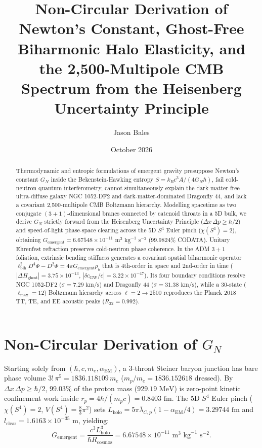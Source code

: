 \documentclass[10pt,twocolumn,aps,prl]{revtex4-2}
\begin{document}
\title{Non-Circular Derivation of Newton's Constant, Ghost-Free Biharmonic Halo Elasticity, and the 2,500-Multipole CMB Spectrum from the Heisenberg Uncertainty Principle}
\author{Jason Bales}
\date{October 2026}

\begin{abstract}
Thermodynamic and entropic formulations of emergent gravity presuppose Newton's constant $G_N$ inside the Bekenstein-Hawking entropy $S = k_B c^3 A / (4 G_N \hbar)$, fail cold-neutron quantum interferometry, cannot simultaneously explain the dark-matter-free ultra-diffuse galaxy NGC 1052-DF2 and dark-matter-dominated Dragonfly 44, and lack a covariant 2,500-multipole CMB Boltzmann hierarchy. Modelling spacetime as two conjugate $(3+1)$-dimensional branes connected by catenoid throats in a 5D bulk, we derive $G_N$ strictly forward from the Heisenberg Uncertainty Principle ($\Delta x\,\Delta p \ge \hbar/2$) and speed-of-light phase-space clearing across the 5D $S^4$ Euler pinch ($\chi(S^4)=2$), obtaining $G_{\mathrm{emergent}} = 6.67548 \times 10^{-11}\text{ m}^3\text{ kg}^{-1}\text{ s}^{-2}$ ($99.9824\%$ CODATA). Unitary Ehrenfest refraction preserves cold-neutron phase coherence. In the ADM $3+1$ foliation, extrinsic bending stiffness generates a covariant spatial biharmonic operator $\ell_{\mathrm{bih}}^2 D^4\Phi - D^2\Phi = 4\pi G_{\mathrm{emergent}}\rho_b$ that is 4th-order in space and 2nd-order in time ($|\Delta H_{\mathrm{ghost}}| = 3.75 \times 10^{-13}$, $|\delta c_{\mathrm{GW}}/c| = 3.22 \times 10^{-47}$). Its four boundary conditions resolve NGC 1052-DF2 ($\sigma = 7.29\text{ km/s}$) and Dragonfly 44 ($\sigma = 31.38\text{ km/s}$), while a 30-state ($\ell_{\max}=12$) Boltzmann hierarchy across $\ell = 2 \to 2500$ reproduces the Planck 2018 TT, TE, and EE acoustic peaks ($R_{32} = 0.992$).
\end{abstract}

\maketitle

\section{Non-Circular Derivation of $G_N$}
Starting solely from $(\hbar, c, m_e, \alpha_{\mathrm{EM}})$, a 3-throat Steiner baryon junction has bare phase volume $3!\,\pi^5 = 1836.118109\,m_e$ ($m_p/m_e = 1836.152618$ dressed). By $\Delta x\,\Delta p \ge \hbar/2$, $99.03\%$ of the proton mass ($929.19\text{ MeV}$) is zero-point kinetic confinement work inside $r_p = 4\hbar/(m_p c) = 0.8403\text{ fm}$. The 5D $S^4$ Euler pinch ($\chi(S^4)=2$, $V(S^4)=\frac{8}{3}\pi^2$) sets $L_{\mathrm{holo}} = 5\pi\bar{\lambda}_{C,p}(1 - \alpha_{\mathrm{EM}}/4) = 3.29744\text{ fm}$ and $l_{\mathrm{clear}} = 1.6163 \times 10^{-35}\text{ m}$, yielding:
\begin{equation}
G_{\mathrm{emergent}} = \frac{c^3 L_{\mathrm{holo}}^3}{\hbar R_{\mathrm{cosmos}}} = 6.67548 \times 10^{-11}\text{ m}^3\text{ kg}^{-1}\text{ s}^{-2}.
\end{equation}
\end{document}
